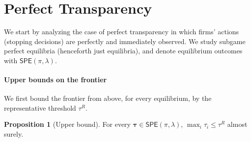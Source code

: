 \documentclass[12pt,reqno]{article}
\newcommand{\de}{\mathop{}\!\mathrm{d}}
\newcommand{\SPE}{\ensuremath{\mathsf{SPE}}}
\theoremstyle{definition} \newtheorem{example}{Example}
\theoremstyle{definition} \newtheorem{condition}{Condition}
\theoremstyle{definition} \newtheorem{corollary}{Corollary}
\theoremstyle{definition} \newtheorem{claim}{Claim}
\theoremstyle{definition} \newtheorem{definition}{Definition}
\theoremstyle{definition} \newtheorem{conjecture}{Conjecture}
\theoremstyle{definition} \newtheorem{Lemma}{Lemma}
\theoremstyle{definition} \newtheorem{lemma}{Lemma}
\theoremstyle{plain} \newtheorem{theorem}{Theorem}
\theoremstyle{definition} \newtheorem{assumption}{Assumption}
\theoremstyle{definition} \newtheorem*{assumptionnonumber}{Assumption}
\theoremstyle{definition} \newtheorem*{theoremNoNumber}{Proposition}
\theoremstyle{definition}
\theoremstyle{definition}\newtheorem{proposition}{Proposition}
\theoremstyle{definition} \newtheorem{result}{Result}
\theoremstyle{definition} \newtheorem*{definitionNoNumber}{Definition}
\theoremstyle{definition} \newtheorem{Definition}{Definition}
\theoremstyle{definition} \newtheorem*{DefinitionNoNumber}{Definition}
\theoremstyle{definition} \newtheorem*{fact}{Fact}
\theoremstyle{definition} \newtheorem*{property}{Property}
\theoremstyle{definition} \newtheorem{remark}{Remark}
\begin{document}

\section{Perfect Transparency}
We start by analyzing the case of perfect transparency in which firms' actions (stopping decisions) are perfectly and immediately observed. We study subgame perfect equilibria (henceforth just equilibria), and  denote equilibrium outcomes with $\SPE(\pi,\lambda)$. 


\paragraph{Upper bounds on the frontier}
We first bound the frontier from above, for every equilibrium, by the representative threshold $\tau^R$. 

\begin{proposition}[Upper bound]\label{prop:bounds}
For every $\bm\tau\in\SPE(\pi,\lambda)$, $\max_i\tau_i\le\tau^R$ almost surely. 
\end{proposition}
\end{document}
